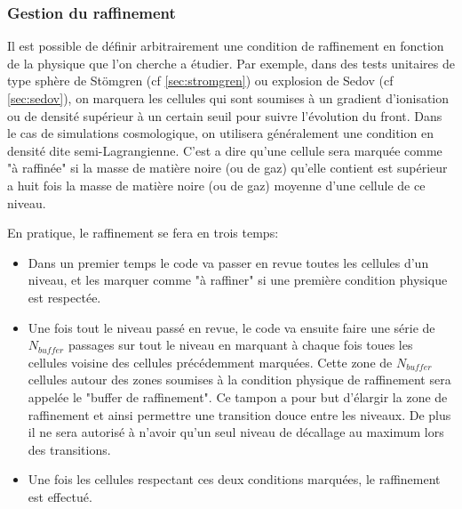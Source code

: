 
\subsubsection{Gestion du raffinement}
\label{sec:raffinement}

Il est possible de définir arbitrairement une condition de raffinement en fonction de la physique que l'on cherche a étudier.
Par exemple, dans des tests unitaires de type sphère de Stömgren (cf \ref{sec:stromgren}) ou explosion de Sedov (cf \ref{sec:sedov}), on marquera les cellules qui sont soumises à un gradient d'ionisation ou de densité supérieur à un certain seuil pour suivre l'évolution du front.
Dans le cas de simulations cosmologique, on utilisera généralement une condition en densité dite semi-Lagrangienne.
C'est a dire qu'une cellule sera marquée comme "à raffinée" si la masse de matière noire (ou de gaz) qu'elle contient est supérieur a huit fois la masse de matière noire (ou de gaz) moyenne d'une cellule de ce niveau.

En pratique, le raffinement se fera en trois temps:

\begin{itemize}
\item Dans un premier temps le code va passer en revue toutes les cellules d'un niveau, et les marquer comme "à raffiner" si une première condition physique est respectée.

\item Une fois tout le niveau passé en revue, le code va ensuite faire une série de $N_{buffer}$ passages sur tout le niveau en marquant à chaque fois toues les cellules voisine des cellules précédemment marquées.
Cette zone de $N_{buffer}$ cellules autour des zones soumises à la condition physique de raffinement sera appelée le "buffer de raffinement".
Ce tampon a pour but d’élargir la zone de raffinement et ainsi permettre une transition douce entre les niveaux.
De plus il ne sera autorisé à n'avoir qu'un seul niveau de décallage au maximum lors des transitions.

\item Une fois les cellules respectant ces deux conditions marquées, le raffinement est effectué.
\end{itemize}

